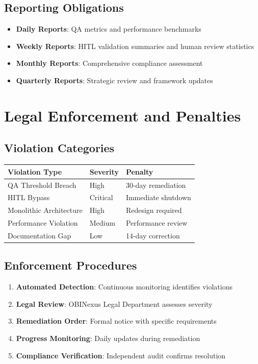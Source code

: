 \documentclass[12pt,a4paper]{article}
\begin{document}
\subsection{Reporting Obligations}

\begin{itemize}
    \item \textbf{Daily Reports}: QA metrics and performance benchmarks
    \item \textbf{Weekly Reports}: HITL validation summaries and human review statistics
    \item \textbf{Monthly Reports}: Comprehensive compliance assessment
    \item \textbf{Quarterly Reports}: Strategic review and framework updates
\end{itemize}

\section{Legal Enforcement and Penalties}

\subsection{Violation Categories}

\begin{center}
\begin{tabular}{|l|l|l|}
\hline
\textbf{Violation Type} & \textbf{Severity} & \textbf{Penalty} \\
\hline
QA Threshold Breach & High & 30-day remediation \\
HITL Bypass & Critical & Immediate shutdown \\
Monolithic Architecture & High & Redesign required \\
Performance Violation & Medium & Performance review \\
Documentation Gap & Low & 14-day correction \\
\hline
\end{tabular}
\end{center}

\subsection{Enforcement Procedures}

\begin{enumerate}
    \item \textbf{Automated Detection}: Continuous monitoring identifies violations
    \item \textbf{Legal Review}: OBINexus Legal Department assesses severity
    \item \textbf{Remediation Order}: Formal notice with specific requirements
    \item \textbf{Progress Monitoring}: Daily updates during remediation
    \item \textbf{Compliance Verification}: Independent audit confirms resolution
\end{enumerate}
\end{document}
